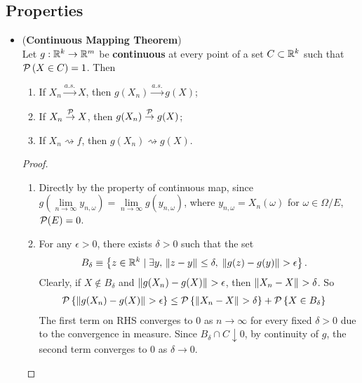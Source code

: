 \documentclass[11pt]{article}
\begin{document}
\subsection{Properties}
\begin{itemize}
\item \begin{theorem} (\textbf{Continuous Mapping Theorem}) \citep{van2000asymptotic}\\
Let $g: {\mathbb R}^{k} \rightarrow {\mathbb R}^{m}$ be \textbf{continuous} at every point of a set $C\subset {\mathbb R}^{k}$ such that ${\mathcal P}\left(X\in C\right)= 1$. Then 
\begin{enumerate}
\item If $X_{n} \stackrel{a.s.}{\rightarrow} X$, then $g(X_{n}) \stackrel{a.s.}{\rightarrow}g(X)$;
\item If $X_{n} \stackrel{{\mathcal P}}{\rightarrow} X$, then $g(X_{n}) \stackrel{{\mathcal P}}{\rightarrow}g(X)$;
\item If $X_{n} \rightsquigarrow f$, then $g(X_{n})\rightsquigarrow g(X)$.
\end{enumerate}
\end{theorem}
\begin{proof}
\begin{enumerate}
\item Directly by the property of continuous map, since $g(\lim\limits_{n\rightarrow \infty}y_{n,\omega})=\lim\limits_{n\rightarrow \infty}g(y_{n,\omega}) $, where $y_{n,\omega}= X_{n}(\omega)$ for $\omega\in \Omega/E$, ${\mathcal P}(E)=0$. 

\item For any $\epsilon>0$, there exists $\delta>0$ such that the set 
\begin{align*}
B_{\delta}&\equiv\left\{z\in {\mathbb R}^{k}\;|\; \exists y,\, \left\|z- y\right\|_{}\le \delta,\; \left\|g(z)-  g(y)\right\|_{} > \epsilon \right\}.
\end{align*}
Clearly, if $X \not\in B_{\delta}$ and $\left\|g(X_{n})- g(X)\right\|_{}>\epsilon$, then $\left\|X_{n}- X\right\|_{}>\delta$. So
\begin{align*}
{\mathcal P}\left\{\left\|g(X_{n})- g(X)\right\|_{}>\epsilon \right\}&\le {\mathcal P}\left\{\left\|X_{n}- X\right\|_{}>\delta\right\}+ {\mathcal P}\left\{X\in B_{\delta}\right\}
\end{align*}
The first term on RHS converges to $0$ as $n\rightarrow \infty$ for every fixed $\delta>0$ due to the convergence in measure. Since $B_{\delta}\cap C \downarrow 0$, by continuity of $g$, the second term converges to $0$ as $\delta\rightarrow 0$.


\end{enumerate}
\end{proof}
\end{itemize}
\end{document}
